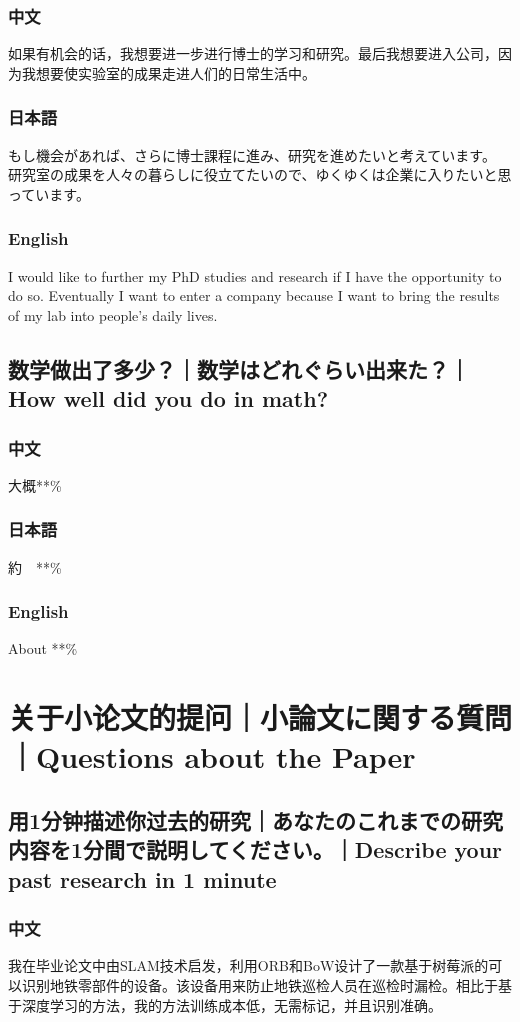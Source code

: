 \documentclass[lang=cn,11pt,a4paper]{elegantpaper}
\begin{document}
\subsubsection{中文}
如果有机会的话，我想要进一步进行博士的学习和研究。最后我想要进入公司，因为我想要使实验室的成果走进人们的日常生活中。
\subsubsection{日本語}
もし機会があれば、さらに博士課程に進み、研究を進めたいと考えています。 研究室の成果を人々の暮らしに役立てたいので、ゆくゆくは企業に入りたいと思っています。
\subsubsection{English}
I would like to further my PhD studies and research if I have the opportunity to do so. Eventually I want to enter a company because I want to bring the results of my lab into people's daily lives.

\subsection{数学做出了多少？｜数学はどれぐらい出来た？｜How well did you do in math?}
\subsubsection{中文}
大概**\%
\subsubsection{日本語}
約　**\%
\subsubsection{English}
About **\%

\section{关于小论文的提问｜小論文に関する質問｜Questions about the Paper}
\subsection{用1分钟描述你过去的研究｜あなたのこれまでの研究内容を1分間で説明してください。｜Describe your past research in 1 minute}
\subsubsection{中文}
我在毕业论文中由SLAM技术启发，利用ORB和BoW设计了一款基于树莓派的可以识别地铁零部件的设备。该设备用来防止地铁巡检人员在巡检时漏检。相比于基于深度学习的方法，我的方法训练成本低，无需标记，并且识别准确。
\end{document}
